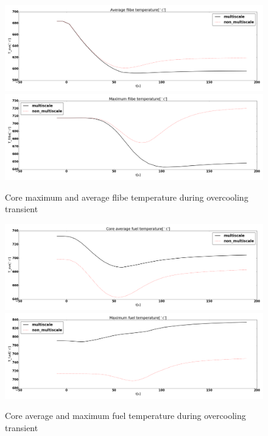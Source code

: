 \documentclass{elsarticle}
\begin{document}
\begin{figure}[h]
    \centering
        
        \centering
        \includegraphics[width=1\textwidth]{./images/diffusion/tmsr/OC/compare_multiscale/T_flibe_ave.png}
        \includegraphics[width=1\textwidth]{./images/diffusion/tmsr/OC/compare_multiscale/T_flibe_max.png}
        \caption{Core maximum and average flibe temperature during overcooling transient}
        \label{fig:tmsr_oc_flibe}
\end{figure}


\begin{figure}[h]
    \centering
        
        \centering
        \includegraphics[width=1\textwidth]{./images/diffusion/tmsr/OC/compare_multiscale/T_fuel_ave.png}
        \includegraphics[width=1\textwidth]{./images/diffusion/tmsr/OC/compare_multiscale/T_fuel_max.png}

        \caption{Core average and maximum fuel temperature during overcooling transient}
        \label{fig:tmsr_oc_fuel}
\end{figure}
\end{document}

